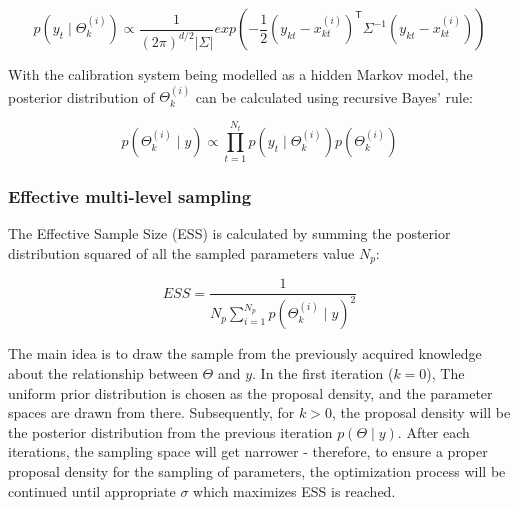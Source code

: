 \begin{equation} \label{eq:likelihood}
p(y_t \mid \Theta_{k}^{(i)}) \propto \frac{1}{(2\pi)^{d/2}|\Sigma|}exp\left(-\frac{1}{2}(y_{kt} - x^{(i)}_{kt})^{\mathsf{T}}\Sigma^{-1}(y_{kt} - x^{(i)}_{kt} )\right)
\end{equation}

With the calibration system being modelled as a hidden Markov model, the posterior distribution of $\Theta_{k}^{(i)}$ can be calculated using recursive Bayes' rule: 

\begin{equation} \label{eq:posterior}
    p(\Theta_{k}^{(i)} \mid y) \propto \prod_{t=1}^{N_{t}} p(y_t \mid \Theta_{k}^{(i)} )p( \Theta_{k}^{(i)} ) 
\end{equation}

\subsubsection{Effective multi-level sampling}

The Effective Sample Size (ESS) is calculated by summing the posterior distribution squared of all the sampled parameters value $N_{p}$:

\begin{equation} \label{eq:ESS}
ESS = \frac{1}{N_{p} \sum_{i=1}^{N_{p}} p(\Theta_{k}^{(i)} \mid y)^2}
\end{equation}

The main idea is to draw the sample from the previously acquired knowledge about the relationship between $\Theta$ and $y$. In the first iteration ($k = 0$), The uniform prior distribution is chosen as the proposal density, and the parameter spaces are drawn from there. Subsequently, for $k > 0$, the proposal density will be the posterior distribution from the previous iteration $p(\Theta \mid y)$. After each iterations, the sampling space will get narrower - therefore, to ensure a proper proposal density for the sampling of parameters, the optimization process will be continued until appropriate $\sigma$ which maximizes ESS is reached. 



    